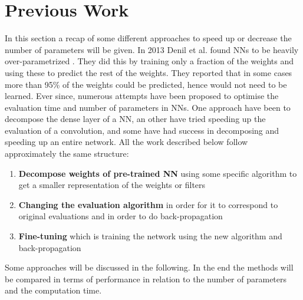 \section{Previous Work} \label{tex:previous_work}
In this section a recap of some different approaches to speed up or decrease the number of parameters will be given. In 2013 Denil et al. found NNs to be heavily over-parametrized \cite{Denil2013}. They did this by training only a fraction of the weights and using these to predict the rest of the weights. They reported that in some cases more than 95\% of the weights could be predicted, hence would not need to be learned. Ever since, numerous attempts have been proposed to optimise the evaluation time and number of parameters in NNs. One approach have been to decompose the dense layer of a NN, an other have tried speeding up the evaluation of a convolution, and some have had success in decomposing and speeding up an entire network. All the work described below follow approximately the same structure:

\begin{enumerate}
    \item \textbf{Decompose weights of pre-trained NN} using some specific algorithm to get a smaller representation of the weights or filters
    \item \textbf{Changing the evaluation algorithm} in order for it to correspond to original evaluations and in order to do back-propagation
    \item \textbf{Fine-tuning} which is training the network using the new algorithm and back-propagation 
\end{enumerate}
Some approaches will be discussed in the following. In the end the methods will be compared in terms of performance in relation to the number of parameters and the computation time.

